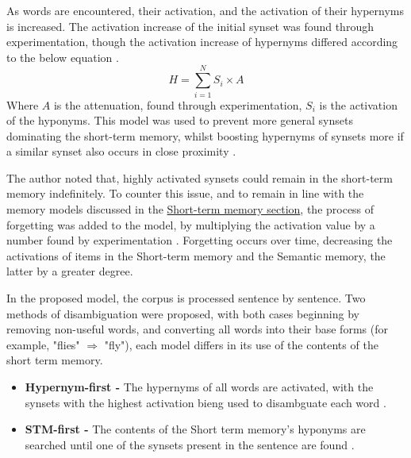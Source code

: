 \documentclass[]{article}
\begin{document}
As words are encountered, their activation, and the activation of their hypernyms is increased. The activation increase of the initial synset was found through experimentation, though the activation increase of hypernyms differed according to the below equation \cite{MattBurkePrevious}. 
\[H = \sum\limits_{i=1}^N S_i \times A\]
Where \(A\) is the attenuation, found through experimentation, \(S_i\) is the activation of the hyponyms. This model was used to prevent more general synsets dominating the short-term memory, whilst boosting hypernyms of synsets more if a similar synset also occurs in close proximity \cite{MattBurkePrevious}.

The author noted that, highly activated synsets could remain in the short-term memory indefinitely. To counter this issue, and to remain in line with the memory models discussed in the \hyperref[ShortTerm]{Short-term memory section}, the process of forgetting was added to the model, by multiplying the activation value by a number found by experimentation \cite{MattBurkePrevious}. Forgetting occurs over time, decreasing the activations of items in the Short-term memory and the Semantic memory, the latter by a greater degree.

In the proposed model, the corpus is processed sentence by sentence. Two methods of disambiguation were proposed, with both cases beginning by removing non-useful words, and converting all words into their base forms (for example, "flies" $\Rightarrow$ "fly"), each model differs in its use of the contents of the short term memory.
\begin{itemize}
	\item[] \textbf{Hypernym-first - } The hypernyms of all words are activated, with the synsets with the highest activation bieng used to disambguate each word \cite{MattBurkePrevious}.
	\item[] \textbf{STM-first - } The contents of the Short term memory's hyponyms are searched until one of the synsets present in the sentence are found \cite{MattBurkePrevious}.
\end{itemize}
\end{document}
